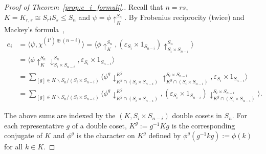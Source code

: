 \documentclass[10pt]{article}
\theoremstyle{definition}
\begin{document}
\begin{proof}[Proof of  Theorem~\ref{prop:e_i_formuli}.]
    Recall that $n=rs$, 
    $K=K_{r,s}\cong S_r\wr S_s\leq S_n$ and 
    $\psi = \phi\uparrow_K^{S_n}$. 
    By Frobenius reciprocity (twice) and 
    Mackey's formula~\cite[(5.2), Problem (5.6)]{Isaacs},
    \begin{equation}\label{Mackey_sum}
    \begin{split}
        e_i 
        &= \langle \psi, \chi^{(1^i) \oplus (n-i)} \rangle 
        = \langle \phi\uparrow_K^{S_n}, (\varepsilon_{S_i} \times 1_{S_{n-i}})\uparrow_{S_i \times S_{n-i}}^{S_n} \rangle \\
        &= \langle {\phi\uparrow_K^{S_n}}\downarrow_{S_i \times S_{n-i}}^{S_n}, \varepsilon_{S_i}\times 1_{S_{n-i}} \rangle \\
        &= 
        \sum_{[g] \in K \backslash S_n / (S_i \times S_{n-i})}
        \langle \phi^g\downarrow^{K^g}_{K^g \cap (S_i \times S_{n-i})}\uparrow_{K^g \cap (S_i \times S_{n-i})}^{S_i \times S_{n-i}}, \varepsilon_{S_i} \times 1_{S_{n-i}} \rangle \\
        &=
        \sum_{[g] \in K \backslash S_n / (S_i \times S_{n-i})}
        \langle \phi^g\downarrow^{K^g}_{K^g \cap (S_i \times S_{n-i})}, (\varepsilon_{S_i} \times 1_{S_{n-i}})\downarrow^{S_i \times S_{n-i}}_{K^g \cap  (S_i \times S_{n-i})} \rangle.
    \end{split}
    \end{equation}
		
    The above sums are indexed by the $(K,S_i\times S_{n-i})$ double cosets in $S_n$. 
    For each representative $g$ of a double coset, 
    $K^g := g^{-1}Kg$ is the corresponding conjugate of $K$ 
    and $\phi^g$ is the character on $K^g$ defined by
    $\phi^g(g^{-1}kg) := \phi(k)$ for all $k \in K$.


\end{proof}
\end{document}
